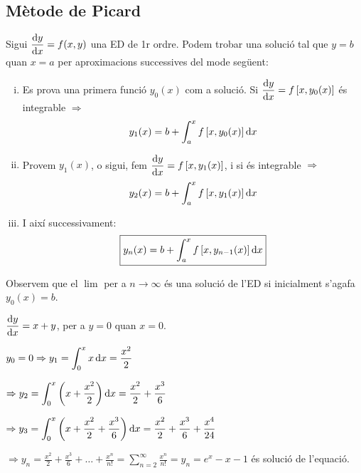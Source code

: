 \subsection{Mètode de Picard}
Sigui $\displaystyle \frac{\mathrm{d} y}{\mathrm{d} x} = f(x, y)$ una ED de 1r ordre. Podem trobar una solució tal que $y = b$ quan $x = a$ per aproximacions successives del mode següent:
\begin{enumerate}[i)]
	\item Es prova una primera funció $y_{0}(x)$ com a solució. Si $\displaystyle \frac{\mathrm{d} y}{\mathrm{d} x} = f \left[ x, y_{0}(x) \right]$ és integrable $\Rightarrow$
		\begin{align*}
			y_{1}(x) = b + \int_{a}^{x} f \left[ x, y_{0}(x) \right] \mathop{}\!\mathrm{d} x
		\end{align*}
	\item Provem $y_{1}(x)$, o sigui, fem $\displaystyle \frac{\mathrm{d} y}{\mathrm{d} x} = f \left[ x, y_{1}(x) \right]$, i si és integrable $\Rightarrow$
			\begin{align*}
			y_{2}(x) = b + \int_{a}^{x} f \left[ x, y_{1}(x) \right] \mathop{}\!\mathrm{d} x
		\end{align*}
	\item I així successivament:
		\begin{align}
			\boxed{y_{n}(x) = b + \int_{a}^{x} f \left[ x, y_{n-1}(x) \right] \mathop{}\!\mathrm{d} x}
		\end{align}
\end{enumerate}

Observem que el $\lim$ per a $n \to \infty$ és una solució de l'ED si inicialment s'agafa $y_{0}(x) = b$.

\begin{example}
	$\displaystyle \frac{\mathrm{d} y}{\mathrm{d} x} = x + y$, per a $y = 0$ quan $x = 0$.

	$\displaystyle y_{0} = 0 \Rightarrow y_{1} = \int_{0}^{x} x \mathop{}\!\mathrm{d} x = \frac{x^{2}}{2}$

	$\displaystyle \Rightarrow y_{2} = \int_{0}^{x} \left( x + \frac{x^{2}}{2} \right) \mathop{}\!\mathrm{d} x = \frac{x^{2}}{2} + \frac{x^{3}}{6}$

	$\displaystyle \Rightarrow y_{3} = \int_{0}^{x} \left( x + \frac{x^{2}}{2} + \frac{x^{3}}{6} \right) \mathop{}\!\mathrm{d} x = \frac{x^{2}}{2} + \frac{x^{3}}{6} + \frac{x^{4}}{24}$

	$\displaystyle \Rightarrow y_{n} = \frac{x^{2}}{2} + \frac{x^{3}}{6} + \dots + \frac{x^{n}}{n!} = \sum_{n=2}^{\infty} \frac{x^{n}}{n!} = \boxed{y_{n} = e^{x} - x - 1}$ és solució de l'equació.
\end{example}
